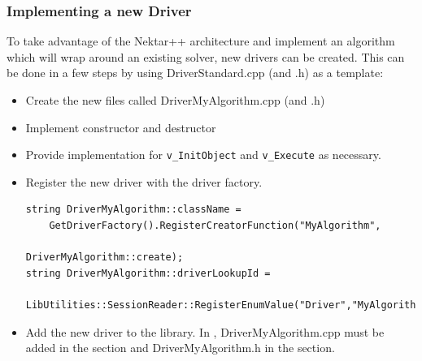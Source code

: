 \subsubsection{Implementing a new Driver}
To take advantage of the Nektar++ architecture and implement an algorithm 
which will wrap around an existing solver, new drivers can be created. This can
be done in a few steps by using DriverStandard.cpp (and .h) as a template:
\begin{itemize}
\item Create the new files called DriverMyAlgorithm.cpp (and .h)
\item Implement constructor and destructor
\item Provide implementation for \texttt{v\_InitObject} and \texttt{v\_Execute}
as necessary.
\item Register the new driver with the driver factory.
\begin{lstlisting}[style=C++Style]
string DriverMyAlgorithm::className = 
    GetDriverFactory().RegisterCreatorFunction("MyAlgorithm",
                                               DriverMyAlgorithm::create); 
string DriverMyAlgorithm::driverLookupId = 
    LibUtilities::SessionReader::RegisterEnumValue("Driver","MyAlgorithm",0);
\end{lstlisting}
\item Add the new driver to the library. In , 
DriverMyAlgorithm.cpp must be added in the  
section and DriverMyAlgorithm.h in the  section.
\end{itemize}
